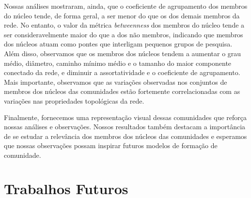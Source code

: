 Nossas análises mostraram, ainda, que o coeficiente de agrupamento dos membros do núcleo tende, de forma geral, a ser 
menor do que os dos demais membros da rede. No entanto, o valor da métrica \textit{betweenness} dos membros 
do núcleo tende a ser consideravelmente maior do que a dos não membros, indicando 
que membros dos núcleos atuam como pontes que interligam pequenos grupos de pesquisa. Além disso, 
observamos que os membros dos núcleos tendem a aumentar o grau médio, diâmetro, caminho mínimo médio e o 
tamanho do maior componente conectado da rede, e diminuir a assortatividade e o coeficiente de agrupamento.
Mais importante, observamos que as variações observadas nos conjuntos de membros dos núcleos das comunidades estão fortemente correlacionadas 
com as variações nas propriedades topológicas da rede. 

Finalmente, fornecemos uma representação visual dessas comunidades que reforça nossas análises e observações. 
Nossos resultados também destacam a importância de se estudar a relevância dos membros dos núcleos das comunidades e esperamos 
que nossas observações possam inspirar futuros modelos de formação de comunidade.



\section{Trabalhos Futuros}

